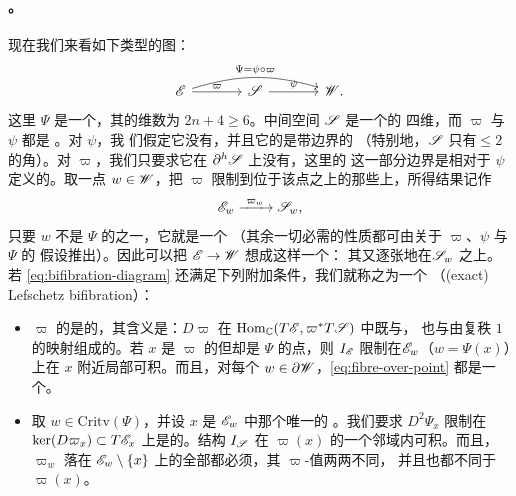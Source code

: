 \paragraph{\trBifibration{}。}\label{sub:bifibrations}
现在我们来看如下类型的图：
\begin{equation}\label{eq:bifibration-diagram}
\begin{tikzcd}[column sep=large]
\scr{E} \ar[r,"\varpi"] \ar[rr,bend left=16,"{\Psi=\psi\circ\varpi}"]
 & \scr{S} \ar[r,"\psi"] & \scr{W}.
\end{tikzcd}
\end{equation}
这里 $\Psi$ 是一个\trLefschetzFibration，其\trTotalSpace{}的维数为
$2n+4\ge 6$。中间空间 $\mathscr{S}$ 是一个\trCorneredBoundary{}的%
\trExactSymplectic{}四维\trManifold，而 $\varpi$ 与 $\psi$ 都是%
\trFibrationWithSingularities{}。对 $\psi$，我
们假定它没有\trCriticalPoint，并且它的\trFiber{}是带边界的%
\trConnected\trSurface{}（特别地，$\mathscr{S}$ 只有\trCodimension{}$\le 2$ 的角）。对
$\varpi$，我们只要求它在 $\partial^h\mathscr{S}$ 上没有\trCriticalValue，这里的
这一部分边界是相对于 $\psi$ 定义的。取一点 $w\in\mathscr{W}$，把
$\varpi$ 限制到位于该点之上的那些\trFiber{}上，所得结果记作
\begin{equation}\label{eq:fibre-over-point}
\mathscr{E}_w\xrightarrow{\ \varpi_w\ }\mathscr{S}_w,
\end{equation}
只要 $w$ 不是 $\Psi$ 的\trCriticalValue{}之一，它就是一个%
\trFibrationWithSingularities{}（其余一切必需的性质都可由关于 $\varpi$、$\psi$ 与 $\Psi$ 的
假设推出）。因此可以把 $\mathscr{E}\to\mathscr{W}$ 想成这样一个\trLefschetzFibration：
其\trSmooth\trFiber{}又逐张地\trFibration{}在\trSurface{}$\mathscr{S}_w$ 之上。若 \eqref{eq:bifibration-diagram}
还满足下列附加条件，我们就称之为一个\textbf{\trLefschetz\trBifibration}
（(exact) Lefschetz bifibration）：
\begin{itemize}
\item $\varpi$ 的\trCriticalPoint{}是\trGeneric{}的，其含义是：$D\varpi$ 在
$\operatorname{Hom}_{\mathbb{C}}(T\mathscr{E},\varpi^*T\mathscr{S})$ 中既与\trZeroSection{}\trTransverse，
也与由复秩 $1$ 的\trLinear{}映射组成的\trStratum{}\trTransverse。若 $x$ 是
$\varpi$ 的\trCriticalPoint{}但却是 $\Psi$ 的\trRegular{}点，则 $I_{\mathscr{E}}$
限制在\trFiber{}$\mathscr{E}_w$（$w=\Psi(x)$）上在 $x$ 附近局部可积。而且，对每个
$w\in\partial\mathscr{W}$，\eqref{eq:fibre-over-point} 都是一个\trLefschetzFibration。
\item 取 $w\in\mathrm{Critv}(\Psi)$，并设 $x$ 是 $\mathscr{E}_w$ 中那个唯一的%
\trCriticalPoint。我们要求 $D^2\Psi_x$ 限制在 $\ker(D\varpi_x)\subset
T\mathscr{E}_x$ 上是\trNondegenerate{}的。\trAlmostComplex{}结构 $I_{\mathscr{S}}$ 在
$\varpi(x)$ 的一个邻域内可积。而且，$\varpi_w$ 落在 $\mathscr{E}_w\setminus\{x\}$
上的全部\trCriticalPoint{}都必须\trNondegenerate，其 $\varpi$-值两两不同，
并且也都不同于 $\varpi(x)$。
\end{itemize}
